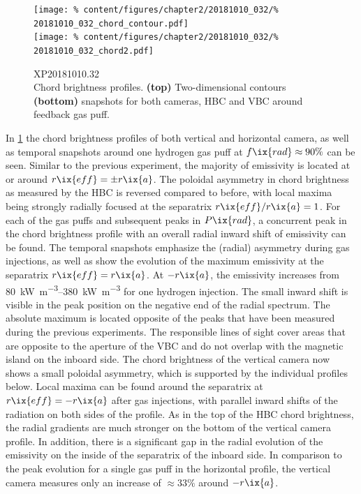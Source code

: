 %
            \begin{figure}[t]%
                \centering%
                \texttt{[image: \%
                    content/figures/chapter2/20181010\_032/\%
                    20181010\_032\_chord\_contour.pdf]}\\%
                \texttt{[image: \%
                    content/figures/chapter2/20181010\_032/\%
                    20181010\_032\_chord2.pdf]}\\%
                \caption{%
                    XP20181010.32\\%
                    Chord brightness profiles. \textbf{(top)} Two-dimensional contours \textbf{(bottom)} snapshots for both cameras, HBC and VBC around feedback gas puff.}\label{fig:20181010.32_CP}%
            \end{figure}%
%
            In \cref{fig:20181010.32_CP} the chord brightness profiles of both vertical and horizontal camera, as well as temporal snapshots around one hydrogen gas puff at $f\ix{rad}\approx90\%$ can be seen. Similar to the previous experiment, the majority of emissivity is located at or around $r\ix{eff}=\pm r\ix{a}$. The poloidal asymmetry in chord brightness as measured by the HBC is reversed compared to before, with local maxima being strongly radially focused at the separatrix $r\ix{eff}/r\ix{a}=1$. For each of the gas puffs and subsequent peaks in $P\ix{rad}$, a concurrent peak in the chord brightness profile with an overall radial inward shift of emissivity can be found. The temporal snapshots emphasize the (radial) asymmetry during gas injections, as well as show the evolution of the maximum emissivity at the separatrix $r\ix{eff}=r\ix{a}$. At $-r\ix{a}$, the emissivity increases from \SIrange{80}{380}{\kilo\watt\per\cubic\meter} for one hydrogen injection. The small inward shift is visible in the peak position on the negative end of the radial spectrum. The absolute maximum is located opposite of the peaks that have been measured during the previous experiments. The responsible lines of sight cover areas that are opposite to the aperture of the VBC and do not overlap with the magnetic island on the inboard side. The chord brightness of the vertical camera now shows a small poloidal asymmetry, which is supported by the individual profiles below. Local maxima can be found around the separatrix at $r\ix{eff}=-r\ix{a}$ after gas injections, with parallel inward shifts of the radiation on both sides of the profile. As in the top of the HBC chord brightness, the radial gradients are much stronger on the bottom of the vertical camera profile. In addition, there is a significant gap in the radial evolution of the emissivity on the inside of the separatrix of the inboard side. In comparison to the peak evolution for a single gas puff in the horizontal profile, the vertical camera measures only an increase of $\approx33\%$ around $-r\ix{a}$.\\%
